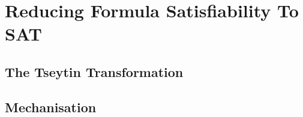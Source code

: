 \chapter{Reducing Formula Satisfiability To SAT}\label{chap:fsat_sat}

\section{The Tseytin Transformation}

\section{Mechanisation}
